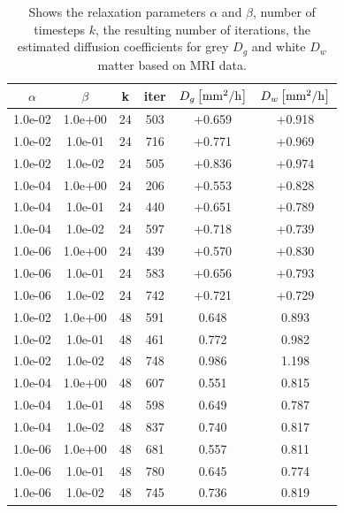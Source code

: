 \documentclass[11pt,a4paper]{article}
\begin{document}
\begin{table}
\centering
\caption{Shows the relaxation parameters $\alpha$ and $\beta$, number of timesteps $k$, the resulting number of iterations, the estimated diffusion coefficients for grey $D_g$ and white $D_w$ matter based on MRI data.}
\begin{tabular}{*{6}c}
$\alpha$ & $\beta$ & k & iter &  $ D_{g} \left[ \mathrm{mm\sp{2}/h} \right] $ & $ D_{w} \left[ \mathrm{mm\sp{2}/h} \right]$ \\
\hline
 1.0e-02 	 & 1.0e+00 	 & 24 & 503 	 & +0.659 & +0.918 \\ 
 1.0e-02 	 & 1.0e-01 	 & 24 & 716 	 & +0.771 & +0.969 \\ 
 1.0e-02 	 & 1.0e-02 	 & 24 & 505 	 & +0.836 & +0.974 \\ 
 1.0e-04 	 & 1.0e+00 	 & 24 & 206 	 & +0.553 & +0.828 \\ 
 1.0e-04 	 & 1.0e-01 	 & 24 & 440 	 & +0.651 & +0.789 \\ 
 1.0e-04 	 & 1.0e-02 	 & 24 & 597 	 & +0.718 & +0.739 \\ 
 1.0e-06 	 & 1.0e+00 	 & 24 & 439 	 & +0.570 & +0.830 \\ 
 1.0e-06 	 & 1.0e-01 	 & 24 & 583 	 & +0.656 & +0.793 \\ 
 1.0e-06 	 & 1.0e-02 	 & 24 & 742 	 & +0.721 & +0.729 \\ 
 
 1.0e-02 	 & 1.0e+00 	 & 48 & 591 	 & 0.648 & 0.893 \\ 
 1.0e-02 	 & 1.0e-01 	 & 48 & 461 	 & 0.772 & 0.982 \\ 
 1.0e-02 	 & 1.0e-02 	 & 48 & 748 	 & 0.986 & 1.198 \\ 
 1.0e-04 	 & 1.0e+00 	 & 48 & 607 	 & 0.551 & 0.815 \\ 
 1.0e-04 	 & 1.0e-01 	 & 48 & 598 	 & 0.649 & 0.787 \\ 
 1.0e-04 	 & 1.0e-02 	 & 48 & 837 	 & 0.740 & 0.817 \\
 1.0e-06 	 & 1.0e+00 	 & 48 & 681 	 & 0.557 & 0.811 \\ 
 1.0e-06 	 & 1.0e-01 	 & 48 & 780 	 & 0.645 & 0.774 \\ 
 1.0e-06 	 & 1.0e-02 	 & 48 & 745 	 & 0.736 & 0.819 \\ 



\end{tabular}
\label{Tab::Real-data}
\end{table} 
 
\end{document}
